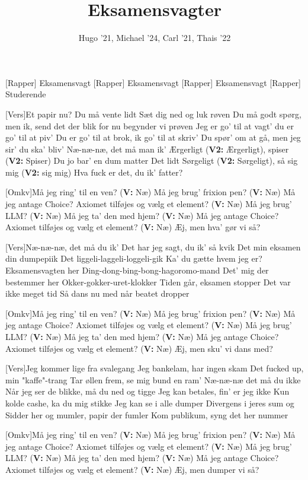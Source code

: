 \documentclass[a4paper,11pt]{article}
\title{Eksamensvagter}
\author{Hugo '21, Michael '24, Carl '21, Thais '22}
\begin{document}
\maketitle

\begin{roles}
[Rapper] Eksamensvagt
[Rapper] Eksamensvagt
[Rapper] Eksamensvagt
[Rapper] Studerende
\end{roles}

\begin{song}
[Vers]Et papir nu? Du må vente lidt
Sæt dig ned og luk røven
Du må godt spørg, men ik, send det der blik
for nu begynder vi prøven
Jeg er go' til at vagt' du er go' til at piv'
Du er go' til at brok, ik go' til at skriv'
Du spør' om at gå, men jeg sir' du ska' bliv'
Næ-næ-næ, det må man ik'
Ærgerligt (\textbf{V2:} Ærgerligt), spiser (\textbf{V2:} Spiser)
Du jo bar' en dum matter
Det lidt Sørgeligt (\textbf{V2:} Sørgeligt), så sig mig (\textbf{V2:} sig mig) 
Hva fuck er det, du ik' fatter?

[Omkv]Må jeg ring' til en ven? (\textbf{V:} Næ)
Må jeg brug' frixion pen? (\textbf{V:} Næ)
Må jeg antage Choice? Axiomet tilføjes
og vælg et element? (\textbf{V:} Næ)
Må jeg brug' LLM? (\textbf{V:} Næ)
Må jeg ta' den med hjem? (\textbf{V:} Næ)
Må jeg antage Choice? Axiomet tilføjes
og vælg et element? (\textbf{V:} Næ)
Æj, men hva' gør vi så?

[Vers]Næ-næ-næ, det må du ik'
Det har jeg sagt, du ik' så kvik
Det min eksamen din dumpepiik
Det liggeli-laggeli-loggeli-gik
Ka' du gætte hvem jeg er?
Eksamensvagten her
Ding-dong-bing-bong-hagoromo-mand
Det' mig der bestemmer her
Okker-gokker-uret-klokker
Tiden går, eksamen stopper
Det var ikke meget tid
Så dans nu med når beatet dropper

[Omkv]Må jeg ring' til en ven? (\textbf{V:} Næ)
Må jeg brug' frixion pen? (\textbf{V:} Næ)
Må jeg antage Choice? Axiomet tilføjes
og vælg et element? (\textbf{V:} Næ)
Må jeg brug' LLM? (\textbf{V:} Næ)
Må jeg ta' den med hjem? (\textbf{V:} Næ)
Må jeg antage Choice? Axiomet tilføjes
og vælg et element? (\textbf{V:} Næ)
Æj, men sku' vi dans med?

[Vers]Jeg kommer lige fra svalegang
Jeg bankelam, har ingen skam
Det fucked up, min "kaffe"-trang
Tar øllen frem, se mig bund en ram'
Næ-næ-næ det må du ikke
Når jeg ser de blikke, må du ned og tigge  
Jeg kan betales, fin' er jeg ikke
Kun kolde cashe, ka du mig stikke
Jeg kan se i alle dumper
Divergens i jeres sum og 
Sidder her og mumler, papir der fumler
Kom publikum, syng det her nummer

[Omkv]Må jeg ring' til en ven? (\textbf{V:} Næ)
Må jeg brug' frixion pen? (\textbf{V:} Næ)
Må jeg antage Choice? Axiomet tilføjes
og vælg et element? (\textbf{V:} Næ)
Må jeg brug' LLM? (\textbf{V:} Næ)
Må jeg ta' den med hjem? (\textbf{V:} Næ)
Må jeg antage Choice? Axiomet tilføjes
og vælg et element? (\textbf{V:} Næ)
Æj, men dumper vi så?
\end{song}
\end{document}
